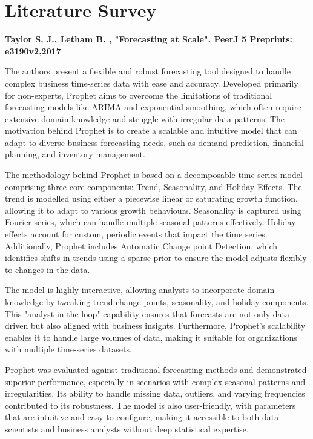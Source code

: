 \chapter{Literature Survey}

\textbf{\cite{taylor2017forecasting}Taylor S. J., Letham B. , "Forecasting at Scale". PeerJ 5 Preprints: e3190v2,2017}

The authors  present a flexible and robust forecasting tool designed to handle complex business time-series data with ease and accuracy. Developed primarily for non-experts, Prophet aims to overcome the limitations of traditional forecasting models like ARIMA and exponential smoothing, which often require extensive domain knowledge and struggle with irregular data patterns. The motivation behind Prophet is to create a scalable and intuitive model that can adapt to diverse business forecasting needs, such as demand prediction, financial planning, and inventory management.

The methodology behind Prophet is based on a decomposable time-series model comprising three core components: Trend, Seasonality, and Holiday Effects. The trend is modelled using either a piecewise linear or saturating growth function, allowing it to adapt to various growth behaviours. Seasonality is captured using Fourier series, which can handle multiple seasonal patterns effectively. Holiday effects account for custom, periodic events that impact the time series. Additionally, Prophet includes Automatic Change point Detection, which identifies shifts in trends using a sparse prior to ensure the model adjusts flexibly to changes in the data.

The model is highly interactive, allowing analysts to incorporate domain knowledge by tweaking trend change points, seasonality, and holiday components. This "analyst-in-the-loop" capability ensures that forecasts are not only data-driven but also aligned with business insights. Furthermore, Prophet’s scalability enables it to handle large volumes of data, making it suitable for organizations with multiple time-series datasets.

Prophet was evaluated against traditional forecasting methods and demonstrated superior performance, especially in scenarios with complex seasonal patterns and irregularities. Its ability to handle missing data, outliers, and varying frequencies contributed to its robustness. The model is also user-friendly, with parameters that are intuitive and easy to configure, making it accessible to both data scientists and business analysts without deep statistical expertise.

